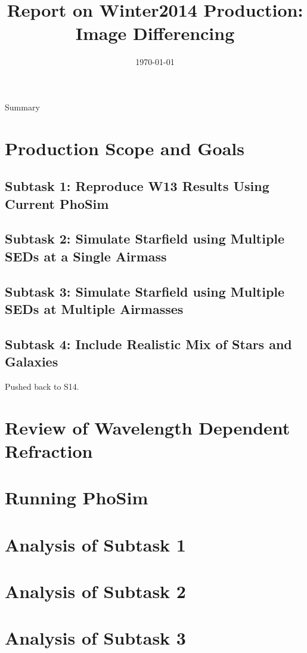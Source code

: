 \documentclass[prd, nofootinbib, floatfix, 11pt, tightenlines, times]{article}
\title{\vspace{-22mm} \Large{Report on Winter2014 Production: Image Differencing} \vspace{-6mm}}
\date{\today}
\begin{document}
\maketitle
Summary

\clearpage
\tableofcontents
\clearpage

\section{Production Scope and Goals}
\subsection{Subtask 1: Reproduce W13 Results Using Current PhoSim}
\subsection{Subtask 2: Simulate Starfield using Multiple SEDs at a Single Airmass}
\subsection{Subtask 3: Simulate Starfield using Multiple SEDs at Multiple Airmasses}
\subsection{Subtask 4: Include Realistic Mix of Stars and Galaxies}
Pushed back to S14.
\section{Review of Wavelength Dependent Refraction}
\section{Running PhoSim}
\section{Analysis of Subtask 1}
\section{Analysis of Subtask 2}
\section{Analysis of Subtask 3}
\end{document}
